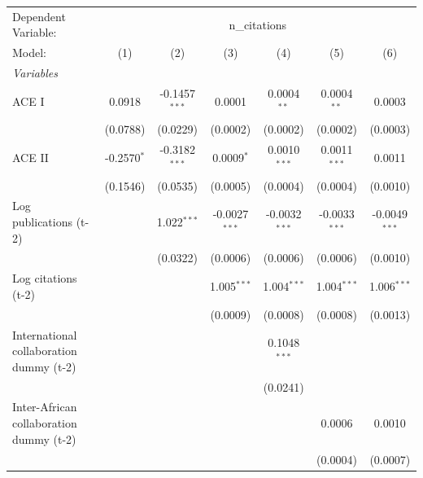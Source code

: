 
\begingroup
\centering
\begin{tabular}{lcccccc}
   \tabularnewline \midrule \midrule
   Dependent Variable: & \multicolumn{6}{c}{n\_citations}\\
   Model:                                  & (1)           & (2)             & (3)             & (4)             & (5)             & (6)\\  
   \midrule
   \emph{Variables}\\
   ACE I                                   & 0.0918        & -0.1457$^{***}$ & 0.0001          & 0.0004$^{**}$   & 0.0004$^{**}$   & 0.0003\\   
                                           & (0.0788)      & (0.0229)        & (0.0002)        & (0.0002)        & (0.0002)        & (0.0003)\\   
   ACE II                                  & -0.2570$^{*}$ & -0.3182$^{***}$ & 0.0009$^{*}$    & 0.0010$^{***}$  & 0.0011$^{***}$  & 0.0011\\   
                                           & (0.1546)      & (0.0535)        & (0.0005)        & (0.0004)        & (0.0004)        & (0.0010)\\   
   Log publications (t-2)                  &               & 1.022$^{***}$   & -0.0027$^{***}$ & -0.0032$^{***}$ & -0.0033$^{***}$ & -0.0049$^{***}$\\   
                                           &               & (0.0322)        & (0.0006)        & (0.0006)        & (0.0006)        & (0.0010)\\   
   Log citations (t-2)                     &               &                 & 1.005$^{***}$   & 1.004$^{***}$   & 1.004$^{***}$   & 1.006$^{***}$\\   
                                           &               &                 & (0.0009)        & (0.0008)        & (0.0008)        & (0.0013)\\   
   International collaboration dummy (t-2) &               &                 &                 & 0.1048$^{***}$  &                 &   \\   
                                           &               &                 &                 & (0.0241)        &                 &   \\   
   Inter-African collaboration dummy (t-2) &               &                 &                 &                 & 0.0006          & 0.0010\\   
                                           &               &                 &                 &                 & (0.0004)        & (0.0007)\\   

\end{tabular}
